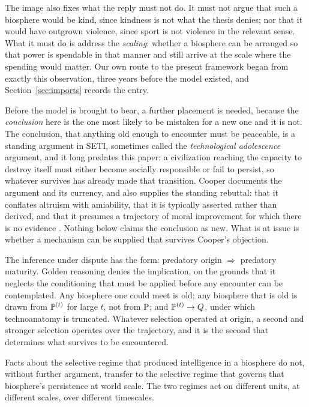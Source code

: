 The image also fixes what the reply must not do. It must not argue that
such a biosphere would be kind, since kindness is not what the thesis
denies; nor that it would have outgrown violence, since sport is not
violence in the relevant sense. What it must do is address the
\emph{scaling}: whether a biosphere can be arranged so that power is
spendable in that manner and still arrive at the scale where the
spending would matter. Our own route to the present framework
began from exactly this observation, three years before the model
existed, and Section~\ref{sec:imports} records the entry.

Before the model is brought to bear, a further placement is needed, because the \emph{conclusion} here is the one most likely to be mistaken
for a new one and it is not. The conclusion, that anything old enough to encounter must be
peaceable, is a standing argument in SETI, sometimes called the
\emph{technological adolescence} argument, and it long predates this
paper: a civilization reaching the capacity to destroy itself must
either become socially responsible or fail to persist, so whatever
survives has already made that transition. Cooper documents the
argument and its currency, and also supplies the standing rebuttal: that
it conflates altruism with amiability, that it is typically asserted
rather than derived, and that it presumes a trajectory of moral
improvement for which there is no evidence \cite{Cooper19}. Nothing
below claims the conclusion as new. What is at issue is whether a
mechanism can be supplied that survives Cooper's objection.

The inference under dispute has the form: predatory origin
$\Rightarrow$ predatory maturity. Golden reasoning denies the
implication, on the grounds that it neglects the conditioning that must
be applied before any encounter can be contemplated. Any biosphere one could meet is old; any biosphere
that is old is drawn from $\mathbb{P}^{(t)}$ for large $t$, not from $\mathbb{P}$; and
$\mathbb{P}^{(t)}\to Q$, under which technoanatomy is truncated. Whatever
selection operated at origin, a second and stronger selection operates
over the trajectory, and it is the second that determines what survives
to be encountered.

\setcounter{premise}{3} %
\begin{premise}
\label{gr:phi4}
Facts about the selective regime that produced intelligence in a
biosphere do not, without further argument, transfer to the selective
regime that governs that biosphere's persistence at world scale. The two
regimes act on different units, at different scales, over different
timescales.
\end{premise}

